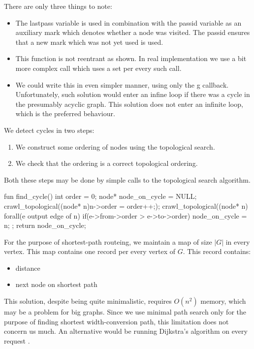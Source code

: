 There are only three things to note:
\begin{itemize}
  \item The lastpass variable is used in combination with the passid variable as an auxiliary mark which denotes whether a node was visited. The passid ensures that a new mark which was not yet used is used.
  \item This function is not reentrant as shown. In real implementation we use a bit more complex call which uses a set per every such call.
  \item We could write this in even simpler manner, using only the g callback. Unfortunately, such solution would enter an infine loop if there was a cycle in the presumably acyclic graph. This solution does not enter an infinite loop, which is the preferred behaviour. 
\end{itemize}

We detect cycles in two steps:
\begin{enumerate}
  \item We construct some ordering of nodes using the topological search.
  \item We check that the ordering is a correct topological ordering.
\end{enumerate}

Both these steps may be done by simple calls to the topological search algorithm.

\begin{code}
fun find_cycle()
{
  int order = 0;
  node* node_on_cycle = NULL;
  crawl_topological((node* n){n->order = order++;});
  crawl_topological((node* n){
    forall(e output edge of n) 
      if(e->from->order > e->to->order)
        node_on_cycle = n;
  };
  return node_on_cycle;
}
\end{code}

For the purpose of shortest-path routeing, we maintain a map of size $| G |$ in every vertex. This map contains one record per every vertex of $G$. This record contains:

\begin{itemize}
  \item distance
  \item next node on shortest path
\end{itemize}

This solution, despite being quite minimalistic, requires $O(n^2)$ memory, which may be a problem for big graphs. Since we use minimal path search only for the purpose of finding shortest width-conversion path, this limitation does not concern us much. An alternative would be running Dijkstra's algorithm on every request \cite{TODO}.


